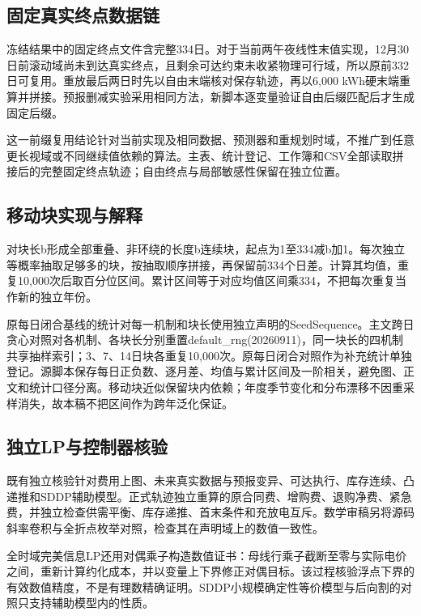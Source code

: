 \subsection{固定真实终点数据链}
冻结结果中的固定终点文件含完整334日。对于当前两午夜线性末值实现，12月30日前滚动域尚未到达真实终点，且剩余可达约束未收紧物理可行域，所以原前332日可复用。重放最后两日时先以自由末端核对保存轨迹，再以6,000 kWh硬末端重算并拼接。预报删减实验采用相同方法，新脚本逐变量验证自由后缀匹配后才生成固定后缀。

这一前缀复用结论针对当前实现及相同数据、预测器和重规划时域，不推广到任意更长视域或不同继续值依赖的算法。主表、统计登记、工作簿和CSV全部读取拼接后的完整固定终点轨迹；自由终点与局部敏感性保留在独立位置。

\subsection{移动块实现与解释}
对块长b形成全部重叠、非环绕的长度b连续块，起点为1至334减b加1。每次独立等概率抽取足够多的块，按抽取顺序拼接，再保留前334个日差。计算其均值，重复10,000次后取百分位区间。累计区间等于对应均值区间乘334，不把每次重复当作新的独立年份。

原每日闭合基线的统计对每一机制和块长使用独立声明的SeedSequence。主文跨日贪心对照对各机制、各块长分别重置default\_rng(20260911)，同一块长的四机制共享抽样索引；3、7、14日块各重复10,000次。原每日闭合对照作为补充统计单独登记。源脚本保存每日正负数、逐月差、均值与累计区间及一阶相关，避免图、正文和统计口径分离。移动块近似保留块内依赖；年度季节变化和分布漂移不因重采样消失，故本稿不把区间作为跨年泛化保证。




\subsection{独立LP与控制器核验}
既有独立核验针对费用上图、未来真实数据与预报变异、可达执行、库存连续、凸递推和SDDP辅助模型。正式轨迹独立重算的原合同费、增购费、退购净费、紧急费，并独立检查供需平衡、库存递推、首末条件和充放电互斥。数学审稿另将源码斜率卷积与全折点枚举对照，检查其在声明域上的数值一致性。

全时域完美信息LP还用对偶乘子构造数值证书：母线行乘子截断至零与实际电价之间，重新计算约化成本，并以变量上下界修正对偶目标。该过程核验浮点下界的有效数值精度，不是有理数精确证明。SDDP小规模确定性等价模型与后向割的对照只支持辅助模型内的性质。


\clearpage

